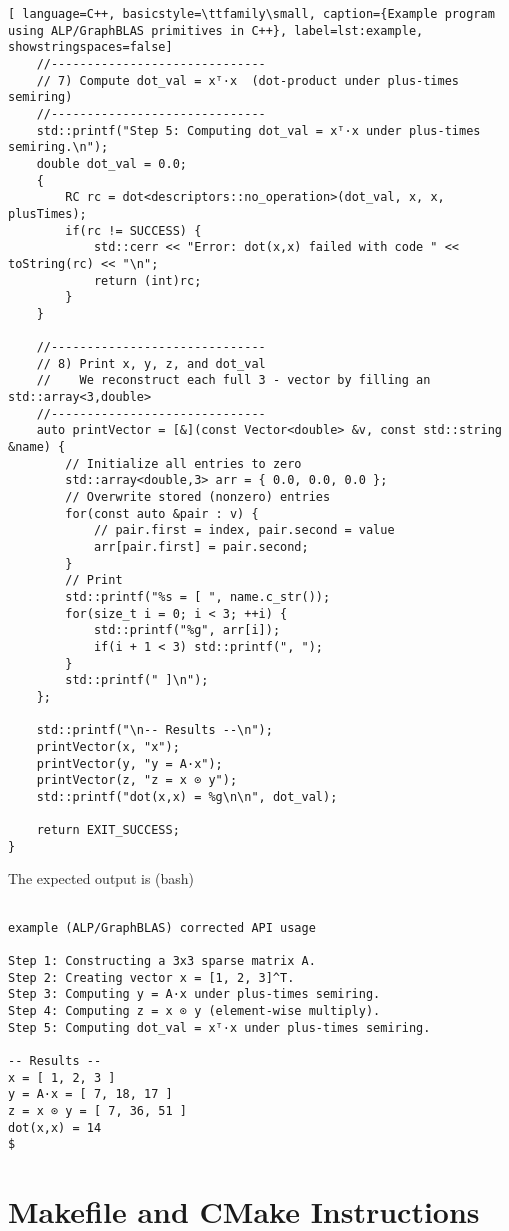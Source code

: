 \begin{lstlisting}[ language=C++, basicstyle=\ttfamily\small, caption={Example program using ALP/GraphBLAS primitives in C++}, label=lst:example, showstringspaces=false]
    //------------------------------
    // 7) Compute dot_val = xᵀ·x  (dot‐product under plus‐times semiring)
    //------------------------------
    std::printf("Step 5: Computing dot_val = xᵀ·x under plus‐times semiring.\n");
    double dot_val = 0.0;
    {
        RC rc = dot<descriptors::no_operation>(dot_val, x, x, plusTimes);
        if(rc != SUCCESS) {
            std::cerr << "Error: dot(x,x) failed with code " << toString(rc) << "\n";
            return (int)rc;
        }
    }

    //------------------------------
    // 8) Print x, y, z, and dot_val
    //    We reconstruct each full 3 - vector by filling an std::array<3,double>
    //------------------------------
    auto printVector = [&](const Vector<double> &v, const std::string &name) {
        // Initialize all entries to zero
        std::array<double,3> arr = { 0.0, 0.0, 0.0 };
        // Overwrite stored (nonzero) entries
        for(const auto &pair : v) {
            // pair.first = index, pair.second = value
            arr[pair.first] = pair.second;
        }
        // Print
        std::printf("%s = [ ", name.c_str());
        for(size_t i = 0; i < 3; ++i) {
            std::printf("%g", arr[i]);
            if(i + 1 < 3) std::printf(", ");
        }
        std::printf(" ]\n");
    };

    std::printf("\n-- Results --\n");
    printVector(x, "x");
    printVector(y, "y = A·x");
    printVector(z, "z = x ⊙ y");
    std::printf("dot(x,x) = %g\n\n", dot_val);

    return EXIT_SUCCESS;
}
\end{lstlisting}

The expected output is (bash)

\begin{lstlisting}[style=terminal]

example (ALP/GraphBLAS) corrected API usage

Step 1: Constructing a 3x3 sparse matrix A.
Step 2: Creating vector x = [1, 2, 3]^T.
Step 3: Computing y = A·x under plus‐times semiring.
Step 4: Computing z = x ⊙ y (element‐wise multiply).
Step 5: Computing dot_val = xᵀ·x under plus‐times semiring.

-- Results --
x = [ 1, 2, 3 ]
y = A·x = [ 7, 18, 17 ]
z = x ⊙ y = [ 7, 36, 51 ]
dot(x,x) = 14
$
\end{lstlisting}



\section{Makefile and CMake Instructions}\label{sec:build_instructions}

